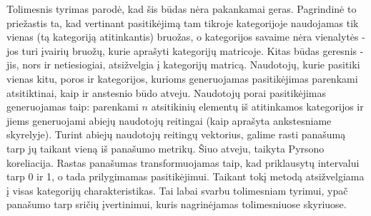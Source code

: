 \documentclass{VUMIFInfMagistrinis}
\begin{document}
\indent
Tolimesnis tyrimas parodė, kad šis būdas nėra pakankamai geras. Pagrindinė to priežastis ta, kad vertinant pasitikėjimą tam tikroje kategorijoje naudojamas tik vienas (tą kategoriją atitinkantis) bruožas, o kategorijos savaime nėra vienalytės - jos turi įvairių bruožų, kurie aprašyti kategorijų matricoje. 
\newline
\indent
Kitas būdas geresnis - jis, nors ir netiesiogiai, atsižvelgia į kategorijų matricą. Naudotojų, kurie pasitiki vienas kitu, poros ir kategorijos, kurioms generuojamas pasitikėjimas parenkami atsitiktinai, kaip ir anstesnio būdo atveju. Naudotojų porai pasitikėjimas generuojamas taip: parenkami $n$ atsitikinių elementų iš atitinkamos kategorijos ir jiems generuojami abiejų naudotojų reitingai (kaip aprašyta ankstesniame skyrelyje). Turint abiejų naudotojų reitingų vektorius, galime rasti panašumą tarp jų taikant vieną iš panašumo metrikų. Šiuo atveju, taikyta Pyrsono koreliacija. Rastas panašumas transformuojamas taip, kad priklausytų intervalui tarp 0 ir 1, o tada prilygimamas pasitikėjimui. Taikant tokį metodą atsižvelgiama į visas kategorijų charakteristikas. Tai labai svarbu tolimesniam tyrimui, ypač panašumo tarp sričių įvertinimui, kuris nagrinėjamas tolimesniuose skyriuose.
\end{document}
